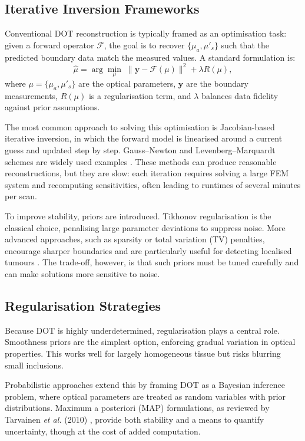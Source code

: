 \subsection{Iterative Inversion Frameworks}
Conventional DOT reconstruction is typically framed as an optimisation task: given a forward operator $\mathcal{F}$, the goal is to recover $\{\mu_a, \mu'_s\}$ such that the predicted boundary data match the measured values. A standard formulation is:
\[
\hat{\mu} = \arg\min_{\mu} \; \| \mathbf{y} - \mathcal{F}(\mu) \|^2 + \lambda R(\mu),
\]
where $\mu = \{\mu_a, \mu'_s\}$ are the optical parameters, $\mathbf{y}$ are the boundary measurements, $R(\mu)$ is a regularisation term, and $\lambda$ balances data fidelity against prior assumptions.  

The most common approach to solving this optimisation is Jacobian-based iterative inversion, in which the forward model is linearised around a current guess and updated step by step. Gauss–Newton and Levenberg–Marquardt schemes are widely used examples \cite{arridge1999}. These methods can produce reasonable reconstructions, but they are slow: each iteration requires solving a large FEM system and recomputing sensitivities, often leading to runtimes of several minutes per scan.  

To improve stability, priors are introduced. Tikhonov regularisation is the classical choice, penalising large parameter deviations to suppress noise. More advanced approaches, such as sparsity or total variation (TV) penalties, encourage sharper boundaries and are particularly useful for detecting localised tumours \cite{gibson2005}. The trade-off, however, is that such priors must be tuned carefully and can make solutions more sensitive to noise.

\subsection{Regularisation Strategies}
Because DOT is highly underdetermined, regularisation plays a central role. Smoothness priors are the simplest option, enforcing gradual variation in optical properties. This works well for largely homogeneous tissue but risks blurring small inclusions.  

Probabilistic approaches extend this by framing DOT as a Bayesian inference problem, where optical parameters are treated as random variables with prior distributions. Maximum a posteriori (MAP) formulations, as reviewed by Tarvainen \emph{et al.} (2010) \cite{tarvainen2010}, provide both stability and a means to quantify uncertainty, though at the cost of added computation.  

